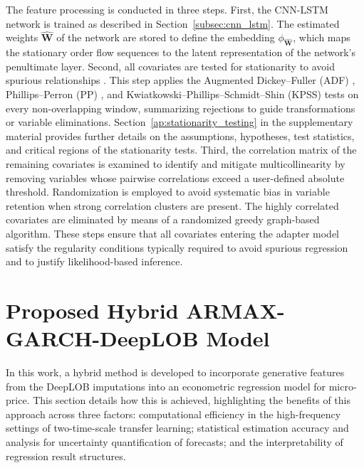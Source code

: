 \documentclass[10pt,a4paper,oneside]{article}
\begin{document}
The feature processing is conducted in three steps. First, the CNN-LSTM network is trained as described in Section~\ref{subsec:cnn_lstm}. The estimated weights $\hat{\mathbf{W}}$ of the network are stored to define the embedding $\phi_{\hat{\mathbf{W}}}$, which maps the stationary order flow sequences to the latent representation of the network's penultimate layer. Second, all covariates are tested for stationarity to avoid spurious relationships \cite{granger1974spurious, phillips1986understanding}. This step applies the Augmented Dickey--Fuller (ADF) \cite{said1984testing, hamilton_time_1994, banerjee1993co}, Phillips--Perron (PP) \cite{phillips1986understanding, hamilton_time_1994, banerjee1993co}, and Kwiatkowski--Phillips--Schmidt--Shin (KPSS) \cite{kwiatkowski1992testing} tests on every non-overlapping window, summarizing rejections to guide transformations or variable eliminations. Section~\ref{ap:stationarity_testing} in the supplementary material provides further details on the assumptions, hypotheses, test statistics, and critical regions of the stationarity tests. Third, the correlation matrix of the remaining covariates is examined to identify and mitigate multicollinearity by removing variables whose pairwise correlations exceed a user-defined absolute threshold. Randomization is employed to avoid systematic bias in variable retention when strong correlation clusters are present. The highly correlated covariates are eliminated by means of a randomized greedy graph-based algorithm. These steps ensure that all covariates entering the adapter model satisfy the regularity conditions typically required to avoid spurious regression and to justify likelihood-based inference.

\section{Proposed Hybrid ARMAX-GARCH-DeepLOB Model}
\label{subsec:armax_garch_paper}
In this work, a hybrid method is developed to incorporate generative features from the DeepLOB imputations into an econometric regression model for micro-price. This section details how this is achieved, highlighting the benefits of this approach across three factors: computational efficiency in the high-frequency settings of two-time-scale transfer learning; statistical estimation accuracy and analysis for uncertainty quantification of forecasts; and the interpretability of regression result structures.
\end{document}
